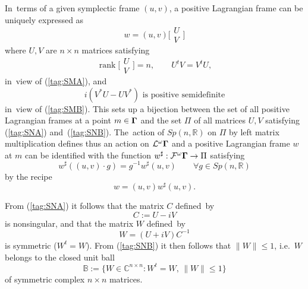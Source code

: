 \documentclass[11pt]{amsart}
\numberwithin{equation}{section}
\theoremstyle{remark}
\let\Bbb\mathbb \let\Cal\mathcal \let\frak\mathfrak
\newcommand\Omg{{\bigam}}   %
\newcommand\FF{\Cal F}
\newcommand\LL{\Cal L}
\newcommand\FwM{\FF^\omega \Omg}
\newcommand\Lag{\LL^\omega \Omg}
\newcommand\rank{\operatorname{rank}}
\newcommand\RR{\mathbb R}
\newcommand{\CC}{\C}
\newcommand{\bigam}{\mbox{\boldmath $\Gamma$}}
\newcommand{\C}{\mathbb C}
\begin{document}
In~terms of a given symplectic frame $(u,v)$, a positive Lagrangian frame can
be uniquely expressed as
\begin{equation}  w=(u,v) \bigg[ \begin{matrix} U \\V \end{matrix} \bigg]
\label{tag:SMC}  \end{equation}
where $U,V$ are $n\times n$ matrices satisfying
\begin{equation}  \rank\bigg[\begin{matrix} U\\V\end{matrix}\bigg]=n,\qquad
U^tV=V^t U, \label{tag:SNA}  \end{equation}
in~view of (\ref{tag:SMA}), and
\begin{equation}  i(V^*U-UV^*)\text{ is positive semidefinite}  \label{tag:SNB}
\end{equation}
in~view of (\ref{tag:SMB}). This sets up a bijection between the set of all
positive Lagrangian frames at a point $m\in \Omg$ and the set $\Pi$ of all
matrices  $U,V$ satisfying (\ref{tag:SNA}) and~(\ref{tag:SNB}). The~action of
$Sp(n,\RR)$ on $\Pi$ by left matrix multiplication defines thus an action on
$\Lag$ and a positive Lagrangian frame $w$ at $m$ can be identified with the
function $w^\sharp:\FwM\to\Pi$ satisfying
$$ w^\sharp( (u,v)\cdot g) = g^{-1} w^\sharp (u,v)
\qquad \forall g\in Sp(n,\RR) $$
by the recipe
\begin{equation}  w= (u,v) w^\sharp(u,v).  \label{tag:SND}  \end{equation}

From (\ref{tag:SNA}) it follows that the matrix $C$ defined~by
$$ C:= U-iV  $$
is nonsingular, and that the matrix $W$ defined~by
$$ W=(U+iV)C^{-1}  $$
is symmetric ($W^t=W$). From (\ref{tag:SNB}) it then follows that $\|W\|\le1$,
i.e.~$W$ belongs to the closed unit ball
$$ \Bbb B := \{W\in\CC^{n\times n}: W^t=W,\,\|W\|\le 1\}  $$
of symmetric complex $n\times n$ matrices.
\end{document}

